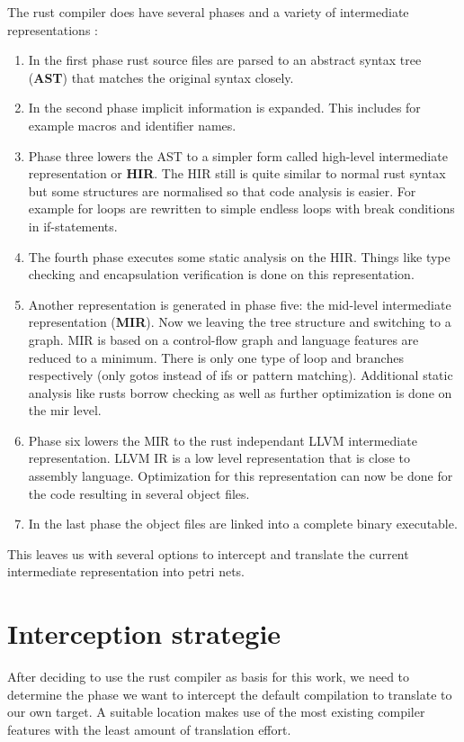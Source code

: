The rust compiler does have several phases and a variety of intermediate representations \cite[Chapter 2.1]{rustc-guide}:
\begin{enumerate}
    \item In the first phase rust source files are parsed to an abstract syntax tree (\textbf{AST}) that matches the original syntax closely.
    \item In the second phase implicit information is expanded. This includes for example macros and identifier names.
    \item Phase three lowers the AST to a simpler form called high-level intermediate representation or \textbf{HIR}.
    The HIR still is quite similar to normal rust syntax but some structures are normalised so that code analysis is easier. 
    For example for loops are rewritten to simple endless loops with break conditions in if-statements.
    \item The fourth phase executes some static analysis on the HIR.
    Things like type checking and encapsulation verification is done on this representation.
    \item Another representation is generated in phase five: the mid-level intermediate representation (\textbf{MIR}).
    Now we leaving the tree structure and switching to a graph.
    MIR is based on a control-flow graph\cite{10.1145/800028.808479} and language features are reduced to a minimum.
    There is only one type of loop and branches respectively (only gotos instead of ifs or pattern matching).
    Additional static analysis like rusts borrow checking as well as further optimization is done on the mir level.
    \item Phase six lowers the MIR to the rust independant LLVM\cite{lattner2004llvm} intermediate representation.
    LLVM IR is a low level representation that is close to assembly language.
    Optimization for this representation can now be done for the code resulting in several object files.
    \item In the last phase the object files are linked into a complete binary executable.
\end{enumerate}
This leaves us with several options to intercept and translate the current intermediate representation into petri nets.

\section{Interception strategie}
\label{app_intercept}
After deciding to use the rust compiler as basis for this work, we need to determine the phase we want to intercept the default compilation to translate to our own target.
A suitable location makes use of the most existing compiler features with the least amount of translation effort.

